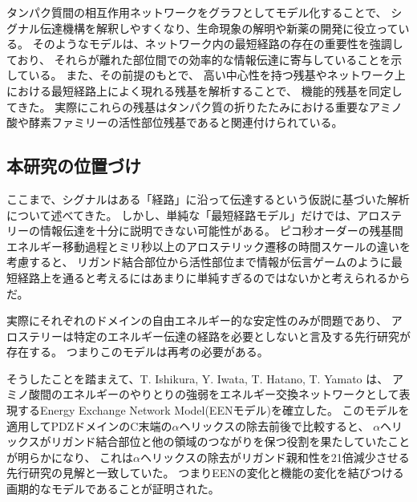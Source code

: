 タンパク質間の相互作用ネットワークをグラフとしてモデル化することで、
シグナル伝達機構を解釈しやすくなり、生命現象の解明や新薬の開発に役立っている。
そのようなモデルは、ネットワーク内の最短経路の存在の重要性を強調\cite{Ghosh2007}しており、
それらが離れた部位間での効率的な情報伝達に寄与していることを示している。
また、その前提のもとで、
高い中心性を持つ残基\cite{amitai2004}やネットワーク上における最短経路上によく現れる残基\cite{delsol2006}を解析することで、
機能的残基を同定してきた。
実際にこれらの残基はタンパク質の折りたたみにおける重要なアミノ酸や酵素ファミリーの活性部位残基であると関連付けられている。

\subsection{本研究の位置づけ}
ここまで、シグナルはある「経路」に沿って伝達するという仮説に基づいた解析について述べてきた。
しかし、単純な「最短経路モデル」だけでは、アロステリーの情報伝達を十分に説明できない可能性がある。
ピコ秒オーダーの残基間エネルギー移動過程\cite{Lim1996}とミリ秒以上のアロステリック遷移\cite{Changeux2005}の時間スケールの違いを考慮すると、
リガンド結合部位から活性部位まで情報が伝言ゲームのように最短経路上を通ると考えるにはあまりに単純すぎるのではないかと考えられるからだ。

実際にそれぞれのドメインの自由エネルギー的な安定性のみが問題であり、
アロステリーは特定のエネルギー伝達の経路を必要としないと言及する先行研究\cite{Hilser2007}\cite{Pan2000}が存在する。
つまりこのモデルは再考の必要がある。

そうしたことを踏まえて、T. Ishikura, Y. Iwata, T. Hatano, T. Yamato は、
アミノ酸間のエネルギーのやりとりの強弱をエネルギー交換ネットワークとして表現するEnergy Exchange Network Model(EENモデル)を確立\cite{Ishikura2015}した。
このモデルを適用してPDZドメインのC末端の$\alpha$ヘリックスの除去前後で比較すると、
$\alpha$ヘリックスがリガンド結合部位と他の領域のつながりを保つ役割を果たしていたことが明らかになり、
これは$\alpha$ヘリックスの除去がリガンド親和性を21倍減少させる先行研究の見解と一致していた。
つまりEENの変化と機能の変化を結びつける画期的なモデルであることが証明された。

